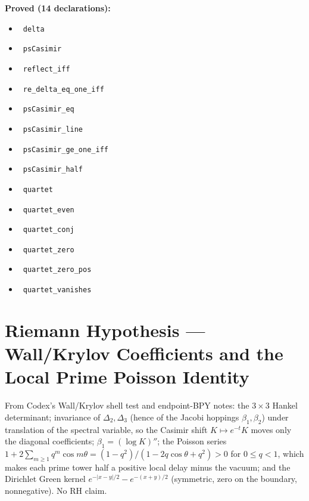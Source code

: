 \documentclass{report}
\theoremstyle{definition}
\begin{document}
\noindent\textbf{Proved (14 declarations):}
\begin{itemize}
  \item {}\leanok\ \texttt{delta}
  \item {}\leanok\ \texttt{psCasimir}
  \item {}\leanok\ \texttt{reflect\_iff}
  \item {}\leanok\ \texttt{re\_delta\_eq\_one\_iff}
  \item {}\leanok\ \texttt{psCasimir\_eq}
  \item {}\leanok\ \texttt{psCasimir\_line}
  \item {}\leanok\ \texttt{psCasimir\_ge\_one\_iff}
  \item {}\leanok\ \texttt{psCasimir\_half}
  \item {}\leanok\ \texttt{quartet}
  \item {}\leanok\ \texttt{quartet\_even}
  \item {}\leanok\ \texttt{quartet\_conj}
  \item {}\leanok\ \texttt{quartet\_zero}
  \item {}\leanok\ \texttt{quartet\_zero\_pos}
  \item {}\leanok\ \texttt{quartet\_vanishes}
\end{itemize}

\section{Riemann Hypothesis --- Wall/Krylov Coefficients and the Local Prime Poisson Identity}
From Codex's Wall/Krylov shell test and endpoint-BPY notes: the $3\times3$ Hankel determinant; invariance of $\Delta_2,\Delta_3$ (hence of the Jacobi hoppings $\beta_1,\beta_2$) under translation of the spectral variable, so the Casimir shift $K\mapsto e^{-t}K$ moves only the diagonal coefficients; $\beta_1=(\log K)''$; the Poisson series $1+2\sum_{m\ge1}q^m\cos m\theta=(1-q^2)/(1-2q\cos\theta+q^2)>0$ for $0\le q<1$, which makes each prime tower half a positive local delay minus the vacuum; and the Dirichlet Green kernel $e^{-|x-y|/2}-e^{-(x+y)/2}$ (symmetric, zero on the boundary, nonnegative). No RH claim.
\end{document}
